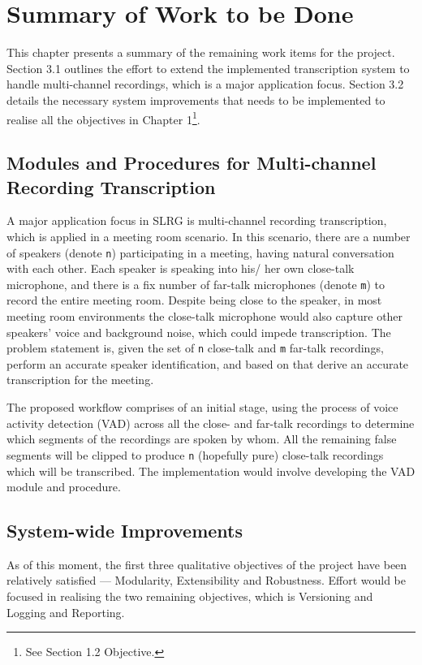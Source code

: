 \chapter{Summary of Work to be Done}

This chapter presents a summary of the remaining work items for the project.
Section 3.1 outlines the effort to extend the implemented transcription system
to handle multi-channel recordings, which is a major application focus. Section
3.2 details the necessary system improvements that needs to be implemented to
realise all the objectives in Chapter 1\footnote{See Section 1.2 Objective.}.

\section{Modules and Procedures for Multi-channel Recording Transcription}

A major application focus in SLRG is multi-channel recording transcription,
which is applied in a meeting room scenario. In this scenario, there are a number
of speakers (denote \texttt{n}) participating in a meeting, having natural
conversation with each other. Each speaker is speaking into his/ her own
close-talk microphone, and there is a fix number of far-talk microphones
(denote \texttt{m}) to record the entire meeting room. Despite being close
to the speaker, in most meeting room environments the close-talk microphone
would also capture other speakers' voice and background noise, which could
impede transcription. The problem statement is, given the set of \texttt{n}
close-talk and \texttt{m} far-talk recordings, perform an accurate speaker
identification, and based on that derive an accurate transcription for the
meeting.

The proposed workflow comprises of an initial stage, using the process of
voice activity detection (VAD) across all the close- and far-talk recordings
to determine which segments of the recordings are spoken by whom. All the
remaining false segments will be clipped to produce \texttt{n} (hopefully pure)
close-talk recordings which will be transcribed. The implementation would
involve developing the VAD module and procedure.

\section{System-wide Improvements}

As of this moment, the first three qualitative objectives of the project have
been relatively satisfied --- Modularity, Extensibility and Robustness. Effort
would be focused in realising the two remaining objectives, which is Versioning
and Logging and Reporting.

